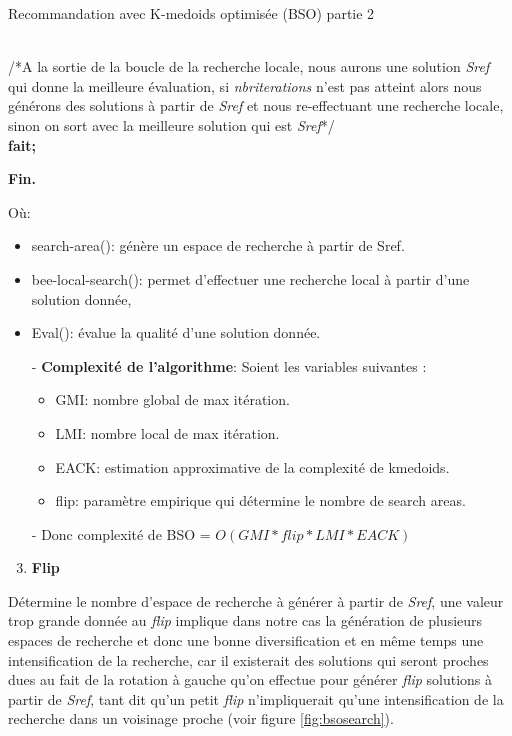 \setcounter{algorithm}{7}
\begin{algorithm}[H]
\caption{Recommandation avec K-medoids optimisée (BSO) partie 2}	
\hspace*{\algorithmicindent}\\ /*A la sortie de la boucle de la recherche locale, nous aurons une solution \textit{Sref} qui donne la meilleure évaluation, si \textit{nbriterations} n'est pas atteint alors nous générons des solutions à partir de \textit{Sref} et nous re-effectuant une recherche locale, sinon on sort avec la meilleure solution qui est \textit{Sref}*/
\hspace*{\algorithmicindent}\\  \textbf{fait;}

\hspace*{\algorithmicindent}\textbf{Fin.}
\end{algorithm}

Où:
\begin{itemize}
	\item search-area(): génère un espace de recherche à partir de Sref.
	\item bee-local-search(): permet d'effectuer une recherche local à partir d'une solution donnée,
	\item Eval(): évalue la qualité d'une solution donnée.
\end{itemize}
\begin{itemize}
	\item [-] \textbf{Complexité de l'algorithme}: Soient les variables suivantes :
	\begin{itemize}
	\item	GMI: nombre global de max itération.
	\item	LMI: nombre local de max itération.
	\item	EACK: estimation approximative de la complexité de kmedoids.
	\item	flip: paramètre empirique qui détermine le nombre de search areas.
	\end{itemize}
	\item [-] Donc complexité de BSO = $O(GMI*flip*LMI*EACK)$
\end{itemize}

\begin{enumerate}[nosep,label=\textbf{\arabic*)}]
	\setcounter{enumi}{2}
	\item \textbf{Flip}
\end{enumerate}\mbox{}\indent Détermine le nombre d'espace de recherche à générer à partir de \textit{Sref}, une valeur trop grande donnée au \textit{flip} implique dans notre cas la génération de plusieurs espaces de recherche et donc une bonne diversification et en même temps une intensification de la recherche, car il existerait des solutions qui seront proches dues au fait de la rotation à gauche qu'on effectue pour générer \textit{flip} solutions à partir de \textit{Sref}, tant dit qu'un petit \textit{flip} n'impliquerait qu'une intensification de la recherche dans un voisinage proche (voir figure \ref{fig:bsosearch}).\\


